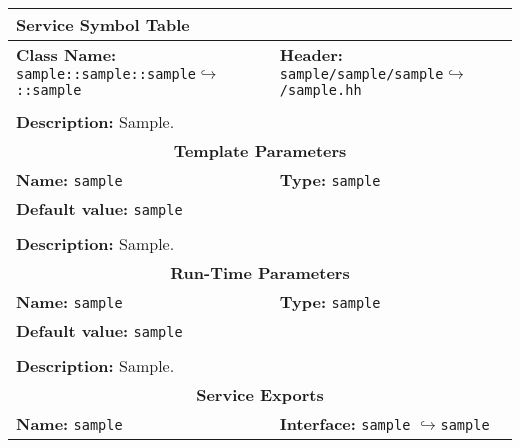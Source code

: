\newpage
\begin{center}
	\begin{tabular}{|p{7.5cm}|p{7.5cm}|}
		\hline
		\multicolumn{2}{|l|}{\textbf{\Large Service Symbol Table}}\\
		\hline
		\multicolumn{1}{|p{7.5cm}}{\textbf{Class Name:} \newline \texttt{sample::sample::sample}\newline$\hookrightarrow$\texttt{::sample}} & \multicolumn{1}{p{7.5cm}|}{\textbf{Header:} \newline \texttt{sample/sample/sample}\newline$\hookrightarrow$\texttt{/sample.hh}}\\
		\multicolumn{2}{|l|}{}\\
		\multicolumn{2}{|p{15cm}|}{\textbf{Description:} \newline Sample.}\\
		\hline
		\hline
		\multicolumn{2}{|c|}{\textbf{\large Template Parameters}}\\
		\hline
		\multicolumn{1}{|p{7.5cm}}{\textbf{Name:} \texttt{sample}} & \multicolumn{1}{p{7.5cm}|}{\textbf{Type:} \texttt{sample}}\\
		\multicolumn{2}{|p{15cm}|}{\textbf{Default value:} \texttt{sample}}\\
		\multicolumn{2}{|l|}{}\\
		\multicolumn{2}{|p{15cm}|}{\textbf{Description:} \newline Sample.}\\
		\hline
		\hline
		\multicolumn{2}{|c|}{\textbf{\large Run-Time Parameters}}\\
		\hline
		\multicolumn{1}{|p{7.5cm}}{\textbf{Name:} \texttt{sample}} & \multicolumn{1}{p{7.5cm}|}{\textbf{Type:} \texttt{sample}}\\
		\multicolumn{2}{|p{15cm}|}{\textbf{Default value:} \texttt{sample}}\\
		\multicolumn{2}{|l|}{}\\
		\multicolumn{2}{|p{15cm}|}{\textbf{Description:} \newline Sample.}\\
		\hline
		\hline
		\multicolumn{2}{|c|}{\textbf{\large Service Exports}}\\
		\hline
		\multicolumn{1}{|p{7.5cm}}{\textbf{Name:} \texttt{sample}} & \multicolumn{1}{p{7.5cm}|}{\textbf{Interface:} \newline \texttt{sample} \newline$\hookrightarrow$\texttt{sample}}\\

\end{tabular}
\end{center}

